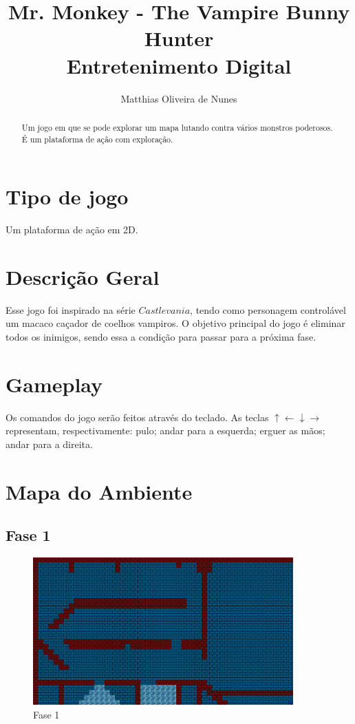 \documentclass[12pt]{article}
\title{Mr. Monkey - The Vampire Bunny Hunter \\ Entretenimento Digital}
\author{Matthias Oliveira de Nunes}
\begin{document}
\maketitle

\begin{abstract}

Um jogo em que se pode explorar um mapa lutando contra vários monstros
poderosos. É um plataforma de ação com exploração.

\end{abstract}

\section{Tipo de jogo}

Um plataforma de ação em 2D.

\section{Descrição Geral}

Esse jogo foi inspirado na série $Castlevania$, tendo como personagem
controlável um macaco caçador de coelhos vampiros. O objetivo principal do jogo
é eliminar todos os inimigos, sendo essa a condição para passar para a próxima
fase.

\section{Gameplay}

Os comandos do jogo serão feitos através do teclado. As teclas $\uparrow
\leftarrow \downarrow \rightarrow$ representam, respectivamente: pulo; andar
para a esquerda; erguer as mãos; andar para a direita.

\section{Mapa do Ambiente}

\subsection{Fase 1}

\begin{figure}[H]
        \centering
        \includegraphics[width=100mm]{map1.png}
        \caption{Fase 1}
        \label{m1}
\end{figure}
\end{document}
